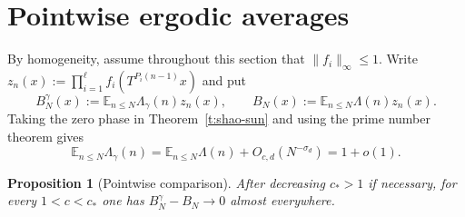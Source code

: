 \documentclass[12pt]{amsart}
\newcommand{\E}{\mathbb E}
\newcommand{\1}{\mathbf 1}
\newtheorem{proposition}[theorem]{Proposition}
\begin{document}
\section{Pointwise ergodic averages}

By homogeneity, assume throughout this section that
$\|f_i\|_\infty\leq1$. Write
$z_n(x):=\prod_{i=1}^{\ell}f_i(T^{P_i(n-1)}x)$ and put
\begin{equation}\label{e:weighted-averages}
 B_N^\gamma(x):=\E_{n\leq N}\Lambda_\gamma(n)z_n(x),
 \qquad
 B_N(x):=\E_{n\leq N}\Lambda(n)z_n(x).
\end{equation}
Taking the zero phase in Theorem~\ref{t:shao-sun} and using the
prime number theorem gives
\begin{equation}\label{e:weight-mass}
 \E_{n\leq N}\Lambda_\gamma(n)
 =\E_{n\leq N}\Lambda(n)+O_{c,d}(N^{-\sigma_d})
 =1+o(1).
\end{equation}

\begin{proposition}[Pointwise comparison]\label{p:pointwise-comparison}
After decreasing $c_*>1$ if necessary, for every $1<c<c_*$ one has
$B_N^\gamma-B_N\to0$ almost everywhere.
\end{proposition}
\end{document}
